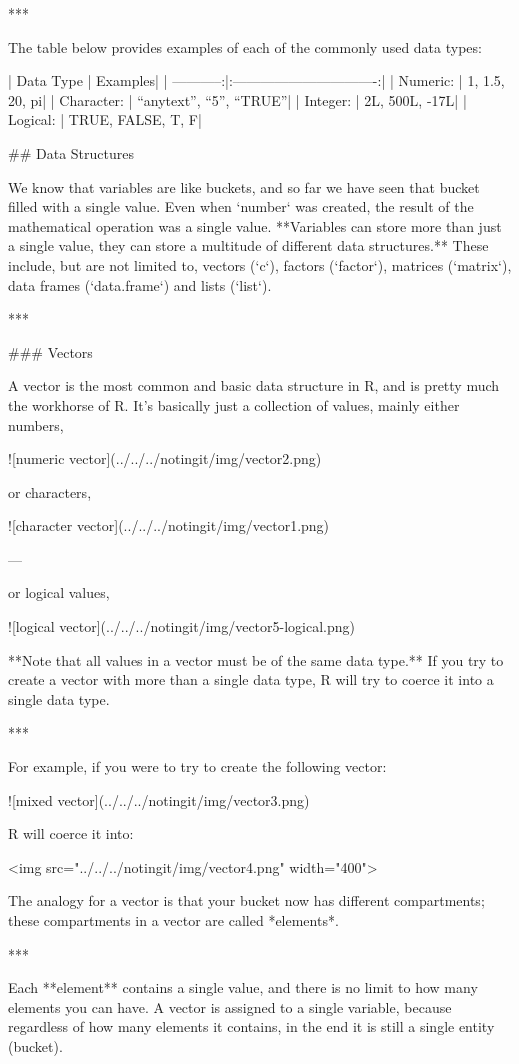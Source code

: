 ***

The table below provides examples of each of the commonly used data types:

| Data Type  | Examples|
| -----------:|:-------------------------------:|
| Numeric:  | 1, 1.5, 20, pi|
| Character:  | “anytext”, “5”, “TRUE”|
| Integer:  | 2L, 500L, -17L|
| Logical:  | TRUE, FALSE, T, F|

## Data Structures

We know that variables are like buckets, and so far we have seen that bucket filled with a single value. Even when `number` was created, the result of the mathematical operation was a single value. **Variables can store more than just a single value, they can store a multitude of different data structures.** These include, but are not limited to, vectors (`c`), factors (`factor`), matrices (`matrix`), data frames (`data.frame`) and lists (`list`).

***

### Vectors

A vector is the most common and basic data structure in R, and is pretty much the workhorse of R. It's basically just a collection of values, mainly either numbers,

![numeric vector](../../../notingit/img/vector2.png)

or characters,

![character vector](../../../notingit/img/vector1.png)

---

or logical values,

![logical vector](../../../notingit/img/vector5-logical.png)

**Note that all values in a vector must be of the same data type.** If you try to create a vector with more than a single data type, R will try to coerce it into a single data type. 

***

For example, if you were to try to create the following vector:

![mixed vector](../../../notingit/img/vector3.png)

R will coerce it into:

<img src="../../../notingit/img/vector4.png" width="400">

The analogy for a vector is that your bucket now has different compartments; these compartments in a vector are called *elements*. 

***

Each **element** contains a single value, and there is no limit to how many elements you can have. A vector is assigned to a single variable, because regardless of how many elements it contains, in the end it is still a single entity (bucket). 

